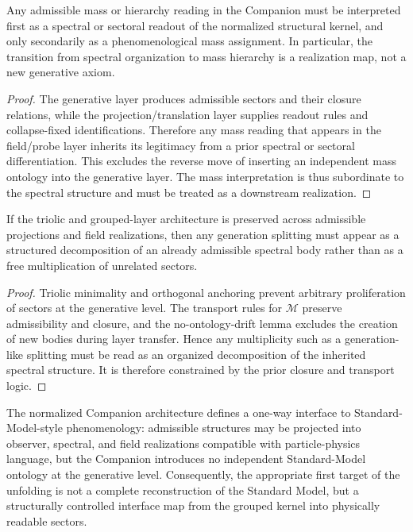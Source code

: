 \begin{lemma}
\label{lem:mass-spectral-reading-lemma}
Any admissible mass or hierarchy reading in the Companion must be interpreted first as a spectral or sectoral readout of the normalized structural kernel, and only secondarily as a phenomenological mass assignment. In particular, the transition from spectral organization to mass hierarchy is a realization map, not a new generative axiom.
\end{lemma}

\begin{proof}
The generative layer produces admissible sectors and their closure relations, while the projection/translation layer supplies readout rules and collapse-fixed identifications. Therefore any mass reading that appears in the field/probe layer inherits its legitimacy from a prior spectral or sectoral differentiation. This excludes the reverse move of inserting an independent mass ontology into the generative layer. The mass interpretation is thus subordinate to the spectral structure and must be treated as a downstream realization.
\end{proof}

\begin{lemma}
\label{lem:generation-splitting-lemma}
If the triolic and grouped-layer architecture is preserved across admissible projections and field realizations, then any generation splitting must appear as a structured decomposition of an already admissible spectral body rather than as a free multiplication of unrelated sectors.
\end{lemma}

\begin{proof}
Triolic minimality and orthogonal anchoring prevent arbitrary proliferation of sectors at the generative level. The transport rules for $\mathcal M$ preserve admissibility and closure, and the no-ontology-drift lemma excludes the creation of new bodies during layer transfer. Hence any multiplicity such as a generation-like splitting must be read as an organized decomposition of the inherited spectral structure. It is therefore constrained by the prior closure and transport logic.
\end{proof}

\begin{theorem}
\label{thm:standard-model-interface-theorem}
The normalized Companion architecture defines a one-way interface to Standard-Model-style phenomenology: admissible structures may be projected into observer, spectral, and field realizations compatible with particle-physics language, but the Companion introduces no independent Standard-Model ontology at the generative level. Consequently, the appropriate first target of the unfolding is not a complete reconstruction of the Standard Model, but a structurally controlled interface map from the grouped kernel into physically readable sectors.
\end{theorem}

